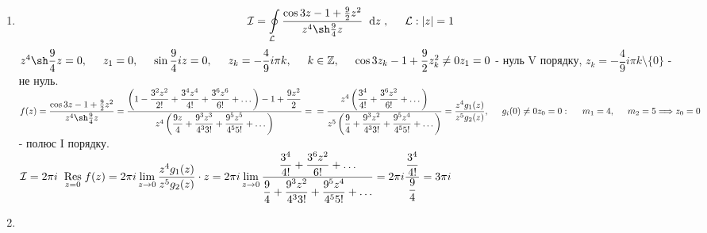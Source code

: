 \documentclass[a4paper,12pt]{article}
\newcommand\tab[1][0.5cm]{\hspace*{#1}}
\newcommand\dx[1]{\hspace*{0.2cm}\textrm{d}{#1}\hspace*{0.1cm}}
\newcommand\Res[1]{\hspace*{0.2cm}\underset{#1}{\textrm{Res}}\hspace*{0.1cm}}
\newcommand\doint[0]{\displaystyle\oint}
\begin{document}
\begin{justify}
\begin{enumerate}
			\item $$\mathcal{I}=\doint\limits_{\mathcal{L}}\dfrac{\cos3z-1+\frac92z^2}{z^4\sh\frac94z}\dx{z},\tab \mathcal{L}:|z|=1$$ $z^4\sh\dfrac94z=0,\tab z_1=0,\tab \sin\dfrac94iz=0,\tab z_k=-\dfrac49i\pi k,\tab k\in\mathbb{Z},\tab \cos3z_k-1+\dfrac92z_k^2\neq0\\z_1=0$ - нуль V порядку, $z_k=-\dfrac49i\pi k\setminus\{0\}$ - не нуль. \\$f(z)=\dfrac{\cos3z-1+\frac92z^2}{z^4\sh\frac94z}=\dfrac{\left(1-\dfrac{3^2z^2}{2!}+\dfrac{3^4z^4}{4!}+\dfrac{3^6z^6}{6!}+\dots\right)-1+\dfrac{9z^2}{2}}{z^4\left(\dfrac{9z}{4}+\dfrac{9^3z^3}{4^33!}+\dfrac{9^5z^5}{4^55!}+\dots\right)}=\\=\dfrac{z^4\left(\dfrac{3^4}{4!}+\dfrac{3^6z^2}{6!}+\dots\right)}{z^5\left(\dfrac{9}{4}+\dfrac{9^3z^2}{4^33!}+\dfrac{9^5z^4}{4^55!}+\dots\right)}=\dfrac{z^4g_1(z)}{z^5g_2(z)},\tab g_i(0)\neq0\\z_0=0:\tab m_1=4,\tab m_2=5\Longrightarrow z_0=0$ - полюс I порядку.\\$\mathcal{I}=2\pi i\Res{z=0}f(z)=2\pi i\lim\limits_{z\to0}\dfrac{z^4g_1(z)}{z^5g_2(z)}\cdot z=2\pi i\lim\limits_{z\to0}\dfrac{\dfrac{3^4}{4!}+\dfrac{3^6z^2}{6!}+\dots}{\dfrac{9}{4}+\dfrac{9^3z^2}{4^33!}+\dfrac{9^5z^4}{4^55!}+\dots}=2\pi i\dfrac{\dfrac{3^4}{4!}}{\dfrac{9}{4}}=3\pi i$
				\begin{figure*}[htp]\centering
				\end{figure*}
			\item $$$$	
 		\end{enumerate}
 	\end{justify}
\end{document}
